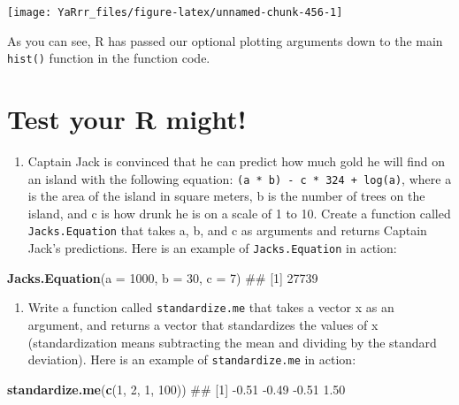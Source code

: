\documentclass[]{book}
\newenvironment{Shaded}{\begin{snugshade}}{\end{snugshade}}
\newcommand{\KeywordTok}[1]{\textcolor[rgb]{0.13,0.29,0.53}{\textbf{#1}}}
\newcommand{\DataTypeTok}[1]{\textcolor[rgb]{0.13,0.29,0.53}{#1}}
\newcommand{\DecValTok}[1]{\textcolor[rgb]{0.00,0.00,0.81}{#1}}
\newcommand{\NormalTok}[1]{#1}
\providecommand{\tightlist}{%
  \setlength{\itemsep}{0pt}\setlength{\parskip}{0pt}}
\theoremstyle{definition}
\theoremstyle{definition}
\theoremstyle{remark}
\begin{document}
\begin{center}\texttt{[image: YaRrr\_files/figure-latex/unnamed-chunk-456-1]} \end{center}

As you can see, R has passed our optional plotting arguments down to the
main \texttt{hist()} function in the function code.

\section{Test your R might!}\label{test-your-r-might-6}

\begin{enumerate}
\def\labelenumi{\arabic{enumi}.}
\tightlist
\item
  Captain Jack is convinced that he can predict how much gold he will
  find on an island with the following equation:
  \texttt{(a\ *\ b)\ -\ c\ *\ 324\ +\ log(a)}, where a is the area of
  the island in square meters, b is the number of trees on the island,
  and c is how drunk he is on a scale of 1 to 10. Create a function
  called \texttt{Jacks.Equation} that takes a, b, and c as arguments and
  returns Captain Jack's predictions. Here is an example of
  \texttt{Jacks.Equation} in action:
\end{enumerate}

\begin{Shaded}
\begin{Highlighting}[]
\KeywordTok{Jacks.Equation}\NormalTok{(}\DataTypeTok{a =} \DecValTok{1000}\NormalTok{, }\DataTypeTok{b =} \DecValTok{30}\NormalTok{, }\DataTypeTok{c =} \DecValTok{7}\NormalTok{)}
\NormalTok{## [1] 27739}
\end{Highlighting}
\end{Shaded}

\begin{enumerate}
\def\labelenumi{\arabic{enumi}.}
\setcounter{enumi}{1}
\tightlist
\item
  Write a function called \texttt{standardize.me} that takes a vector x
  as an argument, and returns a vector that standardizes the values of x
  (standardization means subtracting the mean and dividing by the
  standard deviation). Here is an example of \texttt{standardize.me} in
  action:
\end{enumerate}

\begin{Shaded}
\begin{Highlighting}[]
\KeywordTok{standardize.me}\NormalTok{(}\KeywordTok{c}\NormalTok{(}\DecValTok{1}\NormalTok{, }\DecValTok{2}\NormalTok{, }\DecValTok{1}\NormalTok{, }\DecValTok{100}\NormalTok{))}
\NormalTok{## [1] -0.51 -0.49 -0.51  1.50}
\end{Highlighting}
\end{Shaded}
\end{document}
